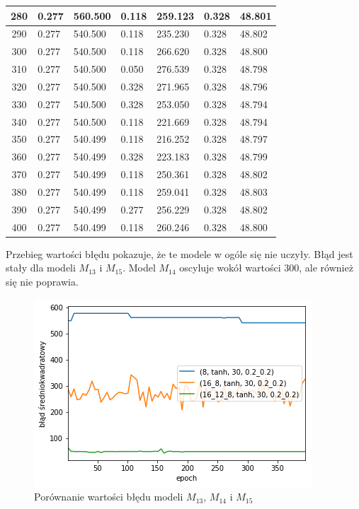 \documentclass{report}
\begin{document}
\begin{minipage}{\textwidth}
\begin{longtable}{|c|l|l|l|l|l|l|}
                     280 & 0.277 & 560.500 & 0.118 & 259.123 & 0.328 & 48.801 \\ \hline
                     290 & 0.277 & 540.500 & 0.118 & 235.230 & 0.328 & 48.802 \\ \hline
                     300 & 0.277 & 540.500 & 0.118 & 266.620 & 0.328 & 48.800 \\ \hline
                     310 & 0.277 & 540.500 & 0.050 & 276.539 & 0.328 & 48.798 \\ \hline
                     320 & 0.277 & 540.500 & 0.328 & 271.965 & 0.328 & 48.796 \\ \hline
                     330 & 0.277 & 540.500 & 0.328 & 253.050 & 0.328 & 48.794 \\ \hline
                     340 & 0.277 & 540.500 & 0.118 & 221.669 & 0.328 & 48.794 \\ \hline
                     350 & 0.277 & 540.499 & 0.118 & 216.252 & 0.328 & 48.797 \\ \hline
                     360 & 0.277 & 540.499 & 0.328 & 223.183 & 0.328 & 48.799 \\ \hline
                     370 & 0.277 & 540.499 & 0.118 & 250.361 & 0.328 & 48.802 \\ \hline
                     380 & 0.277 & 540.499 & 0.118 & 259.041 & 0.328 & 48.803 \\ \hline
                     390 & 0.277 & 540.499 & 0.277 & 256.229 & 0.328 & 48.802 \\ \hline
                     400 & 0.277 & 540.499 & 0.118 & 260.246 & 0.328 & 48.800 \\ \hline
                 \end{longtable}
    \end{minipage}

    Przebieg wartości błędu pokazuje, że te modele w ogóle się nie uczyły.
    Błąd jest stały dla modeli $M_{13}$ i $M_{15}$.
    Model $M_{14}$ oscyluje wokół wartości 300, ale również się nie poprawia.

    \begin{figure}[htp]
        \centering
        \includegraphics[scale=0.8]{./img/arch-error-tanh.png}
        \caption{Porównanie wartości błędu modeli $M_{13}$, $M_{14}$ i $M_{15}$}
    \end{figure}
\end{document}
